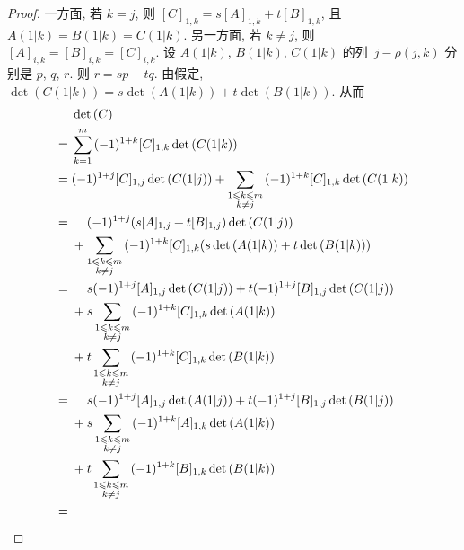 \documentclass[../libro.tex]{subfiles}
\begin{document}
\begin{proof}
    一方面, 若 \(k = j\), 则
    \([C]_{1,k} = s[A]_{1,k} + t[B]_{1,k}\),
    且
    \(A(1|k) = B(1|k) = C(1|k)\).
    另一方面, 若 \(k \neq j\),
    则
    \([A]_{i,k} = [B]_{i,k} = [C]_{i,k}\).
    设 \(A(1|k)\), \(B(1|k)\), \(C(1|k)\)
    的列~\(j - \rho(j, k)\)
    分别是
    \(p\), \(q\), \(r\).
    则
    \(r = sp + tq\).
    由假定,
    \(\det {(C(1|k))} = s \det {(A(1|k))} + t \det {(B(1|k))}\).
    从而
    \begin{align*}
        & \det {(C)}
        \\
        = {} &
        \sum_{k = 1}^{m}
        {(-1)^{1 + k} [C]_{1,k} \det {(C(1|k))}}
        \\
        = {} &
        (-1)^{1 + j} [C]_{1,j} \det {(C(1|j))}
        +
        \sum_{\substack{1 \leq k \leq m \\ k \neq j}}
        {(-1)^{1 + k} [C]_{1,k} \det {(C(1|k))}}
        \\
        = {} &
        \hphantom{{} + {}}
        (-1)^{1 + j} (s[A]_{1,j} + t[B]_{1,j}) \det {(C(1|j))}
        \\
        &
        +
        \sum_{\substack{1 \leq k \leq m \\ k \neq j}}
        {(-1)^{1 + k} [C]_{1,k}
        (s \det {(A(1|k))} + t \det {(B(1|k))})}
        \\
        = {} &
        \hphantom{{} + {}}
        s (-1)^{1 + j} [A]_{1,j} \det {(C(1|j))}
        + t (-1)^{1 + j} [B]_{1,j} \det {(C(1|j))}
        \\
        &
        + s \sum_{\substack{1 \leq k \leq m \\ k \neq j}}
        {(-1)^{1 + k} [C]_{1,k} \det {(A(1|k))}}
        \\
        &
        + t \sum_{\substack{1 \leq k \leq m \\ k \neq j}}
        {(-1)^{1 + k} [C]_{1,k} \det {(B(1|k))}}
        \\
        = {} &
        \hphantom{{} + {}}
        s (-1)^{1 + j} [A]_{1,j} \det {(A(1|j))}
        + t (-1)^{1 + j} [B]_{1,j} \det {(B(1|j))}
        \\
        &
        + s \sum_{\substack{1 \leq k \leq m \\ k \neq j}}
        {(-1)^{1 + k} [A]_{1,k} \det {(A(1|k))}}
        \\
        &
        + t \sum_{\substack{1 \leq k \leq m \\ k \neq j}}
        {(-1)^{1 + k} [B]_{1,k} \det {(B(1|k))}}
        \\
        = {} &
        \hphantom{{} + {}}

\end{align*}
\end{proof}
\end{document}
